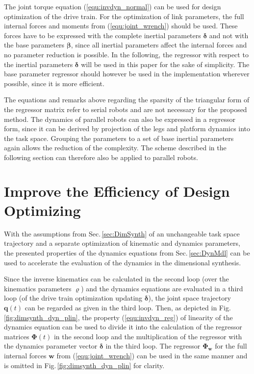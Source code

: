 \documentclass{svproc}
\newcommand{\bm}[1]{\boldsymbol{#1}}
\begin{document}
The joint torque equation (\ref{equ:invdyn_normal}) can be used for design optimization of the drive train.
For the optimization of link parameters, the full internal forces and moments from (\ref{equ:joint_wrench}) should be used.
These forces have to be expressed with the complete inertial parameters $\bm{\delta}$ and not with the base parameters $\bm{\beta}$, since all inertial parameters affect the internal forces and no parameter reduction is possible.
%
In the following, the regressor with respect to the inertial parameters $\bm{\delta}$ will be used in this paper for the sake of simplicity.
The base parameter regressor should however be used in the implementation wherever possible, since it is more efficient.

The equations and remarks above regarding the sparsity of the triangular form of the regressor matrix refer to serial robots and are not necessary for the proposed method.
The dynamics of parallel robots can also be expressed in a regressor form, since it can be derived by projection of the legs and platform dynamics into the task space.
Grouping the parameters to a set of base inertial parameters again allows the reduction of the complexity.
The scheme described in the following section can therefore also be applied to parallel robots.

\newpage

\section{Improve the Efficiency of Design Optimizing}
\label{sec:DesOptImprove}

With the assumptions from Sec.\,\ref{sec:DimSynth} of an unchangeable task space trajectory and a separate optimization of kinematic and dynamics parameters, the presented properties of the dynamics equations from Sec.\,\ref{sec:DynMdl} can be used to accelerate the evaluation of the dynamics in the dimensional synthesis.

Since the inverse kinematics can be calculated in the second loop (over the kinematics parameters $\bm{\varrho}$) and the dynamics equations are evaluated in a third loop (of the drive train optimization updating $\bm{\delta}$), the joint space trajectory $\bm{q}(t)$ can be regarded as given in the third loop.
Then, as depicted in Fig.\,\ref{fig:dimsynth_dyn_plin}, the property (\ref{equ:invdyn_reg}) of linearity of the dynamics equation can be used to divide it into the calculation of the regressor matrices $\bm{\Phi}(t)$ in the second loop and the multiplication of the regressor with the dynamics parameter vector  $\bm{\delta}$ in the third loop.
The regressor $\bm{\Phi}_{\bm{w}}$ for the full internal forces $\bm{w}$ from (\ref{equ:joint_wrench}) can be used in the same manner and is omitted in Fig.\,\ref{fig:dimsynth_dyn_plin} for clarity.
\end{document}
